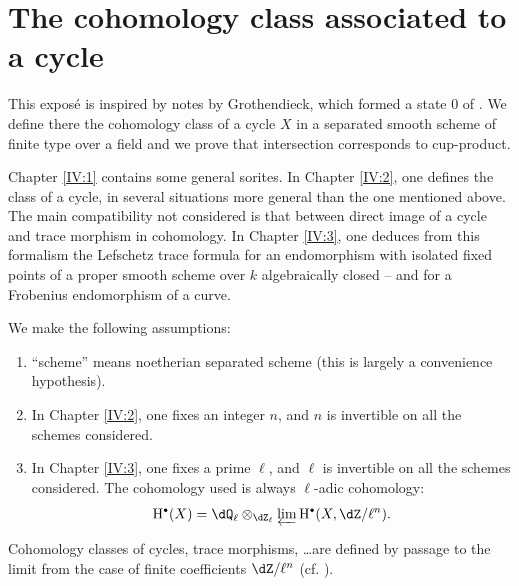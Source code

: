 
\chapter{The cohomology class associated to a cycle}\label{IV}




This expos\'e is inspired by notes by Grothendieck, which formed a state 0
of \cite[IV]{sga5}. We define there the cohomology class of a cycle $X$ in
a separated smooth scheme of finite type over a field and we prove that
intersection corresponds to cup-product.

Chapter \ref{IV:1} contains some general sorites. In Chapter \ref{IV:2}, one
defines the class of a cycle, in several situations more general
than the one mentioned above. The main compatibility not considered is
that between direct image of a cycle and trace morphism in cohomology. In
Chapter \ref{IV:3}, one deduces from this formalism the Lefschetz trace formula for
an endomorphism with isolated fixed points of a proper smooth scheme over $k$
algebraically closed -- and for a Frobenius endomorphism of a curve.

We make the following assumptions:
\begin{enumerate}[\indent 1)]
  \item ``scheme'' means noetherian separated scheme (this is
    largely a convenience hypothesis).
  \item In Chapter \ref{IV:2}, one fixes an integer $n$, and $n$ is invertible on
    all the schemes considered.
  \item In Chapter \ref{IV:3}, one fixes a prime $\ell$, and $\ell$ is
    invertible on all the schemes considered. The cohomology used
    is always $\ell$-adic cohomology:
    \[
      \h^\bullet(X) = \dQ_\ell\otimes_{\dZ_\ell} \varprojlim \h^\bullet(X,\dZ/\ell^n) \text{.}
    \]
\end{enumerate}
Cohomology classes of cycles, trace morphisms, \ldots are defined by
passage to the limit from the case of finite coefficients $\dZ/\ell^n$ (cf.
\cite[VI]{sga5}).


















